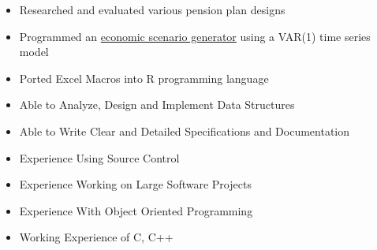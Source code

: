 \documentclass[12pt,a4paper]{altacv}
\begin{document}

\divider

\begin{itemize}
\item Researched and evaluated various pension plan designs
\item Programmed an \href{https://github.com/nathanesau/StocVal}{economic scenario generator} using a VAR(1) time series model
\item Ported Excel Macros into R programming language
\end{itemize}

\divider



\begin{itemize}
\item Able to Analyze, Design and Implement Data Structures
\item Able to Write Clear and Detailed Specifications and Documentation
\item Experience Using Source Control
\item Experience Working on Large Software Projects
\item Experience With Object Oriented Programming
\item Working Experience of C, C++
\end{itemize}
\end{document}
